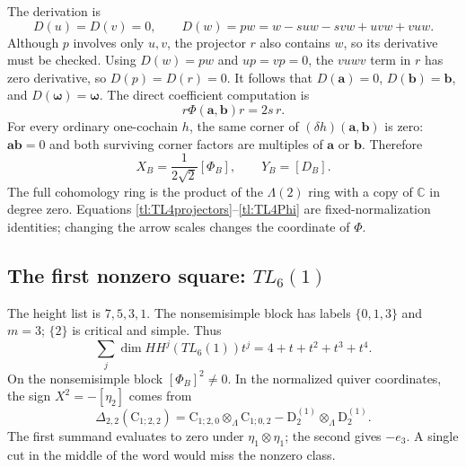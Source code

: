 \documentclass[a4paper,11pt,oneside,reqno]{amsart}
\theoremstyle{definition}
\numberwithin{equation}{section}
\begin{document}
	The derivation is
	\[
	D(u)=D(v)=0,\qquad
	D(w)=pw=w-suw-svw+uvw+vuw.
	\]
	Although $p$ involves only $u,v$, the projector $r$ also contains
	$w$, so its derivative must be checked.  Using $D(w)=pw$ and $up=vp=0$,
	the $vuwv$ term in $r$ has zero derivative, so $D(p)=D(r)=0$.
	It follows that $D(\mathbf{a})=0$, $D(\mathbf{b})=\mathbf{b}$, and $D(\boldsymbol{\omega})=\boldsymbol{\omega}$.
	The direct coefficient computation is
	\begin{equation}\label{tl:TL4Phi}
		r\Phi(\mathbf{a},\mathbf{b})r=2s\,r.
	\end{equation}
	For every ordinary one-cochain $h$, the same corner of
	$(\delta h)(\mathbf{a},\mathbf{b})$ is zero: $\mathbf{a}\mathbf{b}=0$ and both surviving corner
	factors are multiples of $\mathbf{a}$ or $\mathbf{b}$.  Therefore
	\[
	X_B=\frac1{2\sqrt2}[\Phi_B],\qquad Y_B=[D_B].
	\]
	The full cohomology ring is the product of the $\Lambda(2)$ ring
	with a copy of $\mathbb C$ in degree zero.  Equations
	\eqref{tl:TL4projectors}--\eqref{tl:TL4Phi} are fixed-normalization
	identities; changing the arrow scales changes the coordinate of $\Phi$.
	
	\subsection{The first nonzero square: \texorpdfstring{$TL_6(1)$}{TL6(1)}}
	The height list is $7,5,3,1$.  The nonsemisimple block has labels
	$\{0,1,3\}$ and $m=3$; $\{2\}$ is critical and simple.
	Thus
	\[
	\sum_j\dim HH^j(TL_6(1))t^j=4+t+t^2+t^3+t^4.
	\]
	On the nonsemisimple block $[\Phi_B]^2\ne0$.  In the normalized
	quiver coordinates, the sign $X^2=-[\eta_2]$ comes from
	\[
	\Delta_{2,2}(\mathrm C_{1;2,2})
	=\mathrm C_{1;2,0}\otimes_\Lambda\mathrm C_{1;0,2}
	-\mathrm D_2^{(1)}\otimes_\Lambda\mathrm D_2^{(1)}.
	\]
	The first summand evaluates to zero under $\eta_1\otimes\eta_1$;
	the second gives $-e_3$.  A single cut in the middle of the word
	would miss the nonzero class.
	
\end{document}
